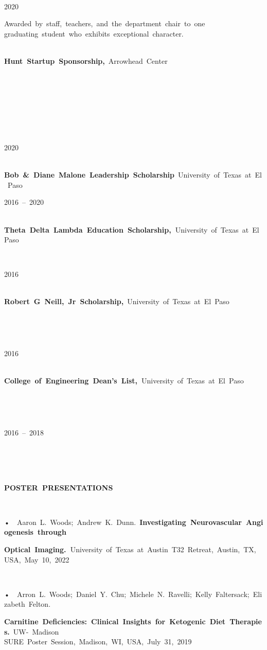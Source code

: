 \documentclass[
]{article}
\begin{document}
~

2020\textbf{~}

Awarded~by~staff,~teachers,~and~the~department~chair~to~one~\\
graduating~student~who~exhibits~exceptional~character.~\\
\strut ~\\
\textbf{Hunt~Startup~Sponsorship,}~Arrowhead~Center~~~

~

~

~

~

2020~

~\\
\textbf{Bob~\&~Diane~Malone~Leadership~Scholarship}~University~of~Texas~at~El~Paso~~~

2016~--~2020~

\textbf{~\\
Theta~Delta~Lambda~Education~Scholarship,~}University~of~Texas~at~El~Paso~

~

2016~

~\\
\textbf{Robert~G~Neill,~Jr~Scholarship,}~University~of~Texas~at~El~Paso~~~

~

~

2016~

~\\
\textbf{College~of~Engineering~Dean's~List,~}University~of~Texas~at~El~Paso~

~

~

2016~--~2018~

~\\
\strut ~\\
\textbf{~\\
POSTER~PRESENTATIONS~}

~

•~~Aaron~L.~Woods;~Andrew~K.~Dunn.~\textbf{Investigating~Neurovascular~Angiogenesis~through~}

\textbf{Optical~Imaging.~}University~of~Texas~at~Austin~T32~Retreat,~Austin,~TX,~USA,~May~10,~2022~

~

•~~Arron~L.~Woods;~Daniel~Y.~Chu;~Michele~N.~Ravelli;~Kelly~Faltersack;~Elizabeth~Felton.~

\textbf{Carnitine~Deficiencies:~Clinical~Insights~for~Ketogenic~Diet~Therapies.}~UW-~Madison~\\
SURE~Poster~Session,~Madison,~WI,~USA,~July~31,~2019\textbf{~}
\end{document}
